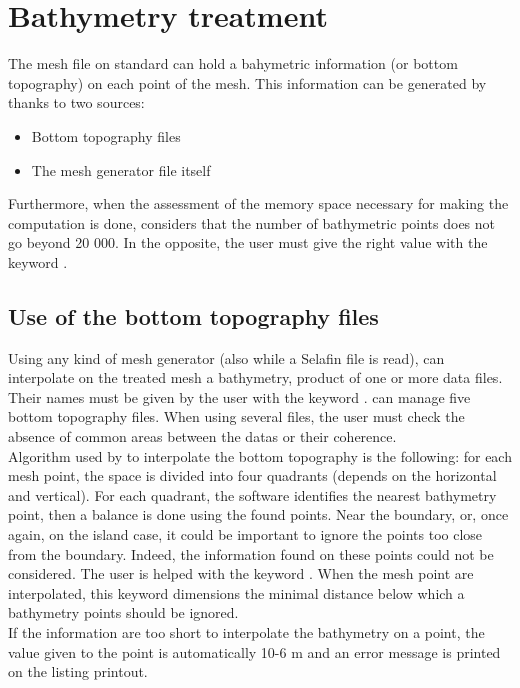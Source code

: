 \chapter{Bathymetry treatment}
The mesh file on \telemacsystem standard can hold a bahymetric information (or
bottom topography) on each point of the mesh. This information can be generated
by \stbtel thanks to two sources:
\begin{itemize}
\item Bottom topography files
\item The mesh generator file itself
\end{itemize}
Furthermore, when the assessment of the memory space necessary for making the
computation is done, \stbtel considers that the number of bathymetric points
does not go beyond 20 000. In the opposite, the user must give the right value
with the keyword .
\section{Use of the bottom topography files}
Using any kind of mesh generator  (also while a Selafin file is read), \stbtel
can interpolate on the treated mesh a bathymetry, product of one or more data
files. Their names must be given by the user with the keyword . \stbtel can manage five bottom topography files. When using
several files, the user  must  check  the absence of common areas between the
datas or their coherence.\\
Algorithm used by \stbtel to interpolate the bottom topography is the
following: for each mesh point, the space is divided into four quadrants
(depends on the horizontal and vertical). For each quadrant, the software
identifies the nearest bathymetry point, then a balance is done using the found
points. Near the boundary, or, once again, on the island case, it could be
important to ignore the points too close from the boundary. Indeed, the
information found on these points could not be considered. The user is helped
with the keyword . When the mesh point are
interpolated, this keyword dimensions the minimal distance below which a
bathymetry points should be ignored.\\
If the \stbtel information are too short to interpolate the bathymetry on a
point, the value given to the point is automatically 10-6 m and an error
message is printed on the listing printout.

